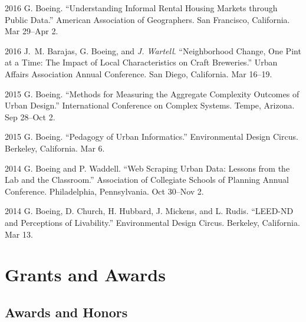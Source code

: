 \documentclass[11pt,letterpaper]{report} %
\begin{document}
\begin{tablist}
        \item[2016] \tab{}G. Boeing. \enquote{Understanding Informal Rental Housing Markets through Public Data.} American Association of Geographers. San Francisco, California. Mar 29--Apr 2.

        \item[2016] \tab{}J.~M. Barajas, G. Boeing, and \textit{J. Wartell}. \enquote{Neighborhood Change, One Pint at a Time: The Impact of Local Characteristics on Craft Breweries.} Urban Affairs Association Annual Conference. San Diego, California. Mar 16--19.

        \item[2015] \tab{}G. Boeing. \enquote{Methods for Measuring the Aggregate Complexity Outcomes of Urban Design.} International Conference on Complex Systems. Tempe, Arizona. Sep 28--Oct 2.

        \item[2015] \tab{}G. Boeing. \enquote{Pedagogy of Urban Informatics.} Environmental Design Circus. Berkeley, California. Mar 6.

        \item[2014] \tab{}G. Boeing and P. Waddell. \enquote{Web Scraping Urban Data: Lessons from the Lab and the Classroom.} Association of Collegiate Schools of Planning Annual Conference. Philadelphia, Pennsylvania. Oct 30--Nov 2.

        \item[2014] \tab{}G. Boeing, D. Church, H. Hubbard, J. Mickens, and L. Rudis. \enquote{LEED-ND and Perceptions of Livability.} Environmental Design Circus. Berkeley, California. Mar 13.

    \end{tablist}



    \section*{Grants and Awards}

    \subsection*{Awards and Honors}
\end{document}
